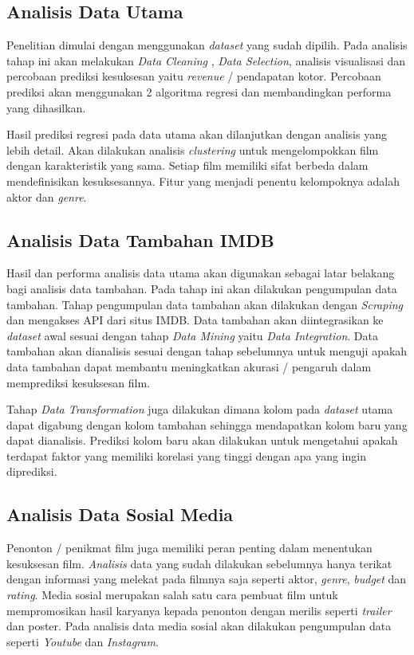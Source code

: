 \subsection{Analisis Data Utama}
Penelitian dimulai dengan menggunakan \textit{dataset} yang sudah dipilih. Pada analisis tahap ini akan melakukan \textit{Data Cleaning} , \textit{Data Selection}, analisis visualisasi dan percobaan prediksi kesuksesan yaitu \textit{revenue} / pendapatan kotor. Percobaan prediksi akan menggunakan 2 algoritma regresi dan membandingkan performa yang dihasilkan. 

 
Hasil prediksi regresi pada data utama akan dilanjutkan dengan analisis yang lebih detail. Akan dilakukan analisis \textit{clustering} untuk mengelompokkan film dengan karakteristik yang sama. Setiap film memiliki sifat berbeda dalam mendefinisikan kesuksesannya. Fitur yang menjadi penentu kelompoknya adalah aktor dan \textit{genre}.

\subsection{Analisis Data Tambahan IMDB} 
Hasil dan performa analisis data utama akan digunakan sebagai latar belakang bagi analisis data tambahan. Pada tahap ini akan dilakukan pengumpulan data tambahan. Tahap pengumpulan data tambahan akan dilakukan dengan \textit{Scraping} dan mengakses API dari situs IMDB. Data tambahan akan diintegrasikan ke \textit{dataset} awal sesuai dengan tahap \textit{Data Mining} yaitu \textit{Data Integration}. Data tambahan akan dianalisis sesuai dengan tahap sebelumnya untuk menguji apakah data tambahan dapat membantu meningkatkan akurasi / pengaruh dalam memprediksi kesuksesan film.


Tahap \textit{Data Transformation} juga dilakukan dimana kolom pada \textit{dataset} utama dapat digabung dengan kolom tambahan sehingga mendapatkan kolom baru yang dapat dianalisis. Prediksi kolom baru akan dilakukan untuk mengetahui apakah terdapat faktor yang memiliki korelasi yang tinggi dengan apa yang ingin diprediksi.


\subsection{Analisis Data Sosial Media}
Penonton / penikmat film juga memiliki peran penting dalam menentukan kesuksesan film. \textit{Analisis} data yang sudah dilakukan sebelumnya hanya terikat dengan informasi yang melekat pada filmnya saja seperti aktor, \textit{genre}, \textit{budget} dan \textit{rating}. Media sosial merupakan salah satu cara pembuat film untuk mempromosikan hasil karyanya kepada penonton dengan merilis seperti \textit{trailer} dan poster. Pada analisis data media sosial akan dilakukan pengumpulan data seperti \textit{Youtube} dan \textit{Instagram}. 

